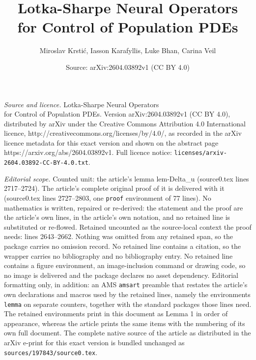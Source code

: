 \documentclass[10pt,a4paper]{amsart}
\title{Lotka-Sharpe Neural Operators \\ for Control of Population PDEs}
\author{Miroslav Krsti\'c, Iasson Karafyllis, Luke Bhan, Carina Veil}
\date{Source: arXiv:2604.03892v1 (CC BY 4.0)}
\begin{document}
\maketitle

\noindent\emph{Source and licence.} Lotka-Sharpe Neural Operators \\ for Control of Population PDEs. Version arXiv:2604.03892v1 (CC BY 4.0), distributed by arXiv under the Creative Commons Attribution 4.0 International licence, http://creativecommons.org/licenses/by/4.0/, as recorded in the arXiv licence metadata for this exact version and shown on the abstract page https://arxiv.org/abs/2604.03892v1. Full licence notice: \texttt{licenses/arxiv-2604.03892-CC-BY-4.0.txt}.\par\smallskip

\noindent\textit{Editorial scope.} Counted unit: the article's lemma lem-Delta\_u (source0.tex lines 2717--2724). The article's complete original proof of it is delivered with it (source0.tex lines 2727--2803, one \texttt{proof} environment of 77 lines). No mathematics is written, repaired or re-derived: the statement and the proof are the article's own lines, in the article's own notation, and no retained line is substituted or re-flowed.  Retained uncounted as the source-local context the proof needs: lines 2643--2662.  Nothing was omitted from any retained span, so the package carries no omission record.  No retained line contains a citation, so the wrapper carries no bibliography and no bibliography entry.  No retained line contains a figure environment, an image-inclusion command or drawing code, so no image is delivered and the package declares no asset dependency.  Editorial formatting only, in addition: an AMS \texttt{amsart} preamble that restates the article's own declarations and macros used by the retained lines, namely the environments \texttt{lemma} on separate counters, together with the standard packages those lines need.  The retained environments print in this document as Lemma 1 in order of appearance, whereas the article prints the same items with the numbering of its own full document.  The complete native source of the article as distributed in the arXiv e-print for this exact version is bundled unchanged as \texttt{sources/197843/source0.tex}.
\end{document}
